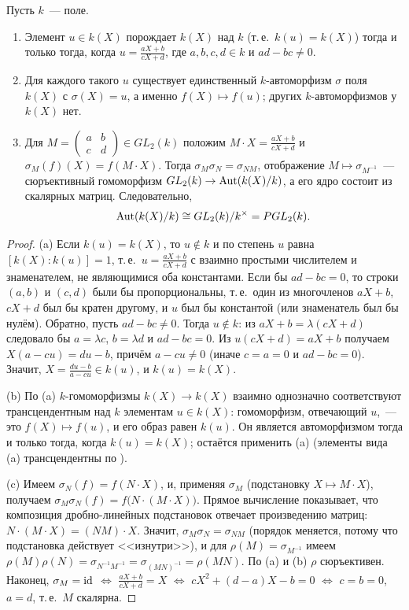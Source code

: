 \begin{proposition}[3.1b]
Пусть $k$~--- поле.
\begin{enumerate}[label=\textup{(\alph*)}]
\item Элемент $u\in k(X)$ порождает $k(X)$ над $k$ (т.\,е.\ $k(u)=k(X)$) тогда и только тогда, когда
$u=\frac{aX+b}{cX+d}$, где $a,b,c,d\in k$ и $ad-bc\ne0$.
\item Для каждого такого $u$ существует единственный $k$-автоморфизм $\sigma$ поля $k(X)$ с $\sigma(X)=u$, а именно
$f(X)\mapsto f(u)$; других $k$-автоморфизмов у $k(X)$ нет.
\item Для $M=\begin{pmatrix}a&b\\c&d\end{pmatrix}\in GL_2(k)$ положим $M\cdot X=\frac{aX+b}{cX+d}$ и
$\sigma_M(f)(X)=f(M\cdot X)$. Тогда $\sigma_M\sigma_N=\sigma_{NM}$, отображение $M\mapsto\sigma_{M^{-1}}$~---
сюръективный гомоморфизм $GL_2(k)\to\operatorname{Aut}(k(X)/k)$, а его ядро состоит из скалярных матриц. Следовательно,
\[
\operatorname{Aut}(k(X)/k)\cong GL_2(k)/k^\times=PGL_2(k).
\]
\end{enumerate}
\end{proposition}

\begin{proof}
(a) Если $k(u)=k(X)$, то $u\notin k$ и по  степень $u$ равна $[k(X):k(u)]=1$, т.\,е.\ $u=\frac{aX+b}{cX+d}$ с
взаимно простыми числителем и знаменателем, не являющимися оба константами. Если бы $ad-bc=0$, то строки $(a,b)$ и
$(c,d)$ были бы пропорциональны, т.\,е.\ один из многочленов $aX+b$, $cX+d$ был бы кратен другому, и $u$ был бы константой
(или знаменатель был бы нулём). Обратно, пусть $ad-bc\ne0$. Тогда $u\notin k$: из $aX+b=\lambda(cX+d)$ следовало бы
$a=\lambda c$, $b=\lambda d$ и $ad-bc=0$. Из $u(cX+d)=aX+b$ получаем $X(a-cu)=du-b$, причём $a-cu\ne0$ (иначе $c=a=0$ и
$ad-bc=0$). Значит, $X=\frac{du-b}{a-cu}\in k(u)$, и $k(u)=k(X)$.

(b) По (a) $k$-гомоморфизмы $k(X)\to k(X)$ взаимно однозначно соответствуют трансцендентным над $k$ элементам
$u\in k(X)$: гомоморфизм, отвечающий $u$,~--- это $f(X)\mapsto f(u)$, и его образ равен $k(u)$. Он является
автоморфизмом тогда и только тогда, когда $k(u)=k(X)$; остаётся применить (a) (элементы вида (a) трансцендентны по
).

(c) Имеем $\sigma_N(f)=f(N\cdot X)$, и, применяя $\sigma_M$ (подстановку $X\mapsto M\cdot X$), получаем
$\sigma_M\sigma_N(f)=f\bigl(N\cdot(M\cdot X)\bigr)$. Прямое вычисление показывает, что композиция дробно-линейных
подстановок отвечает произведению матриц: $N\cdot(M\cdot X)=(NM)\cdot X$. Значит, $\sigma_M\sigma_N=\sigma_{NM}$ (порядок
меняется, потому что подстановка действует <<изнутри>>), и для $\rho(M)=\sigma_{M^{-1}}$ имеем
$\rho(M)\rho(N)=\sigma_{N^{-1}M^{-1}}=\sigma_{(MN)^{-1}}=\rho(MN)$. По (a) и (b) $\rho$ сюръективен. Наконец,
$\sigma_M=\operatorname{id}$ $\iff$ $\frac{aX+b}{cX+d}=X$ $\iff$ $cX^2+(d-a)X-b=0$ $\iff$ $c=b=0$, $a=d$, т.\,е.\ $M$ скалярна.
\end{proof}

